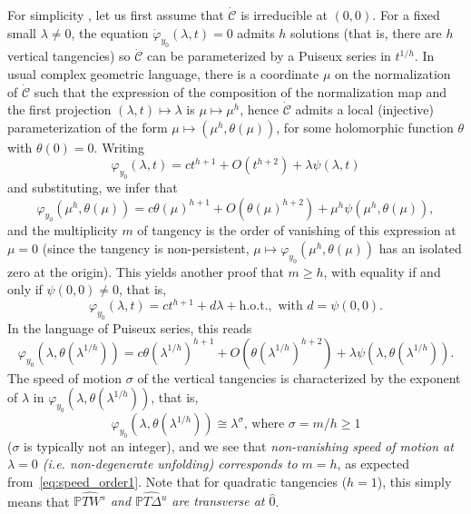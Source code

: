 \documentclass[11pt, oneside]{amsart}
\renewcommand{\P}{\mathbb{P}}
\newcommand{\hot}{{\mathrm{h.o.t.}}}
\theoremstyle{remark}
\theoremstyle{definition}
\theoremstyle{theorem}
\begin{document}
For simplicity , let us first assume that $\dot{ \mathcal {C} }$ is irreducible at $(0, 0)$. For a
 fixed  small $\lambda\neq 0$, the equation $\dot\varphi_{y_0}(\lambda, t) = 0$ admits $h$ solutions 
 (that is, there are $h$ vertical tangencies)
  so  $\dot{\mathcal C}$ can be parameterized by a Puiseux series in $t^{1/h}$. 
 In usual complex geometric language, there is a coordinate $\mu$ on the normalization 
 of ${\dot{\mathcal C}}$ such that the expression of the composition of the 
 normalization map and the first projection $(\lambda, t)\mapsto \lambda$ is
 $\mu\mapsto \mu^h$, hence $\dot{\mathcal C}$ admits a  local (injective) 
 parameterization of the form 
  $\mu\mapsto (\mu^h, \theta(\mu))$, for some holomorphic function $\theta$ with 
 $\theta(0) = 0$.
 Writing 
 \begin{equation}
 \varphi_{y_0}(\lambda, t) = c t^{h+1} + O({t^{h+2}})+ \lambda \psi(\lambda, t)
 \end{equation}
  and 
 substituting, we infer that  
\begin{equation}\label{eq:gamma}
\varphi_{y_0}(\mu^h, \theta(\mu)) = c\theta (\mu)^{h+1} +  O({\theta (\mu)^{h+2}}) + 
 \mu^h \psi(\mu^h, \theta(\mu)),
 \end{equation}
 and the multiplicity $m$  of tangency  is the order of vanishing of this expression at $\mu = 0$ (since the tangency is non-persistent, $\mu\mapsto\varphi_{y_0}(\mu^h, \theta(\mu))$ has an isolated zero at the origin). 
 This yields another proof that $m\geq h$, with equality if and only if 
 $\psi(0, 0)\neq 0$, that is, 
\begin{equation}\label{eq:speed_order1}
\varphi_{y_0}(\lambda , t ) = ct^{h+1} + d \lambda  +\hot, \text{ with }  d=\psi(0,0). 
\end{equation}
 In the language of Puiseux series, this reads
\begin{equation}\label{eq:gamma_puiseux}
\varphi_{y_0}(\lambda, \theta(\lambda^{1/h})) = c\theta (\lambda^{1/h})^{h+1} +  
 O({\theta (\lambda^{1/h})^{h+2}}) + 
 \lambda \psi(\lambda , \theta(\lambda^{1/h})). 
 \end{equation}
The  speed of motion $\sigma$ of the vertical tangencies is characterized  by the 
 exponent of $\lambda$ in $\varphi_{y_0}(\lambda , \theta(\lambda^{1/h}))$, 
 that is, 
 \begin{equation}\label{eq:sigma}
 \varphi_{y_0}(\lambda , \theta(\lambda^{1/h}))\cong \lambda^\sigma
 \text{, where }
 \sigma = m/h\geq 1\end{equation} ($\sigma$  is typically not an integer), 
 and we see that \emph{non-vanishing speed of motion at $\lambda =0$ 
 (i.e. non-degenerate unfolding)
 corresponds   to $m=h$}, as expected from~\eqref{eq:speed_order1}.  
 Note that   for quadratic tangencies  ($h=1$), this simply 
means that \emph{$\widehat {\P T W^s}$ and $\widehat {\P T \Delta^u}$ are transverse at $\widehat 0$}. 
 
\end{document}

